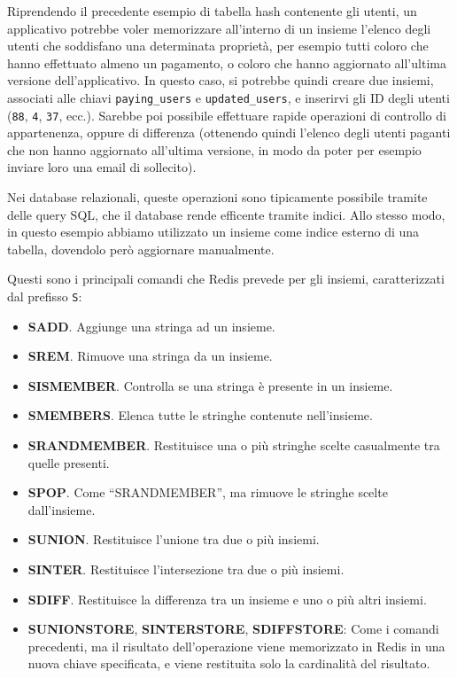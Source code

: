 Riprendendo il precedente esempio di tabella hash contenente gli utenti, un applicativo potrebbe
voler memorizzare all'interno di un insieme l'elenco degli utenti che soddisfano una determinata
proprietà, per esempio tutti coloro che hanno effettuato almeno un pagamento, o coloro che hanno
aggiornato all'ultima versione dell'applicativo. In questo caso, si potrebbe quindi creare due
insiemi, associati alle chiavi \verb|paying_users| e \verb|updated_users|, e inserirvi gli ID degli
utenti (\verb|88|, \verb|4|, \verb|37|, ecc.). Sarebbe poi possibile effettuare rapide operazioni di
controllo di appartenenza, oppure di differenza (ottenendo quindi l'elenco degli utenti paganti che
non hanno aggiornato all'ultima versione, in modo da poter per esempio inviare loro una email di
sollecito).

Nei database relazionali, queste operazioni sono tipicamente possibile tramite delle query SQL, che
il database rende efficente tramite indici. Allo stesso modo, in questo esempio abbiamo utilizzato
un insieme come indice esterno di una tabella, dovendolo però aggiornare manualmente.

Questi sono i principali comandi che Redis prevede per gli insiemi, caratterizzati dal prefisso
\verb|S|:

\begin{itemize}
	\medskip
	\item \textbf{SADD}. Aggiunge una stringa ad un insieme.
	\item \textbf{SREM}. Rimuove una stringa da un insieme.
	\item \textbf{SISMEMBER}. Controlla se una stringa è presente in un insieme.
	\item \textbf{SMEMBERS}. Elenca tutte le stringhe contenute nell'insieme.
	\item \textbf{SRANDMEMBER}. Restituisce una o più stringhe scelte casualmente tra quelle
	presenti.
	\item \textbf{SPOP}. Come ``SRANDMEMBER'', ma rimuove le stringhe scelte dall'insieme.
	\item \textbf{SUNION}. Restituisce l'unione tra due o più insiemi.
	\item \textbf{SINTER}. Restituisce l'intersezione tra due o più insiemi.
	\item \textbf{SDIFF}. Restituisce la differenza tra un insieme e uno o più altri insiemi.
	\item \textbf{SUNIONSTORE}, \textbf{SINTERSTORE}, \textbf{SDIFFSTORE}: Come i comandi
	precedenti, ma il risultato dell'operazione viene memorizzato in Redis in una nuova chiave
	specificata, e viene restituita solo la cardinalità del risultato.
\end{itemize}


